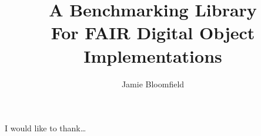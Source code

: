 \documentclass[12pt,BSc,wordcount,twoside,anon]{muthesis}
\begin{document}
\figurespagefalse{}
\tablespagefalse{}
\copyrightfalse{}

\title{A Benchmarking Library\\
  For FAIR Digital Object Implementations}
\author{Jamie Bloomfield}

\beforeabstract{}



\afterabstract{}

I would like to thank\ldots
\afterpreface{}


% 
% 





\appendix
% 
\end{document}

